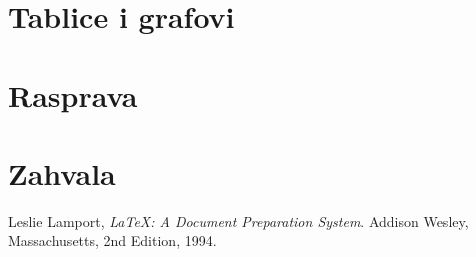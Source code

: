 \documentclass{scrreprt}
\begin{document}
\chapter{Tablice i grafovi}

\chapter{Rasprava}

\chapter{Zahvala}

\begin{thebibliography}{9}

   Leslie Lamport, \emph{\LaTeX: A Document Preparation
    System}. Addison Wesley, Massachusetts, 2nd Edition, 1994.

\end{thebibliography}
\end{document}
